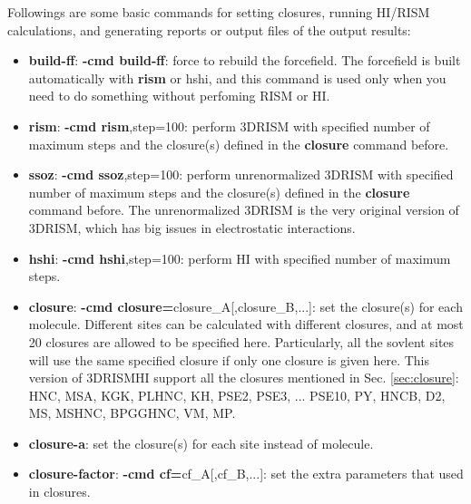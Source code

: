 \documentclass[aip,amsmath,amssymb,reprint,onecolumn]{revtex4-1}
\begin{document}
Followings are some basic commands for setting closures, running HI/RISM calculations, and generating reports or output files of the output results:

\begin{itemize}
    \item {\bf build-ff}: {\bf -cmd build-ff}: force to rebuild the forcefield. The forcefield is built automatically with {\bf rism} or {\rm hshi}, and this command is used only when you need to do something without perfoming RISM or HI.

    \item {\bf rism}: {\bf -cmd rism},step=100: perform 3DRISM with specified number of maximum steps and the closure(s) defined in the {\bf closure} command before.
    \item {\bf ssoz}: {\bf -cmd ssoz},step=100: perform unrenormalized 3DRISM with specified number of maximum steps and the closure(s) defined in the {\bf closure} command before. The unrenormalized 3DRISM is the very original version of 3DRISM, which has big issues in electrostatic interactions.
    \item {\bf hshi}: {\bf -cmd hshi},step=100: perform HI with specified number of maximum steps.

    \item {\bf closure}: {\bf -cmd closure=}closure\_A[,closure\_B,...]: set the closure(s) for each molecule. Different sites can be calculated with different closures, and at most 20 closures are allowed to be specified here. Particularly, all the sovlent sites will use the same specified closure if only one closure is given here. This version of 3DRISMHI support all the closures mentioned in Sec. \ref{sec:closure}: HNC, MSA, KGK, PLHNC, KH, PSE2, PSE3, ... PSE10, PY, HNCB, D2, MS, MSHNC, BPGGHNC, VM, MP.
    \item {\bf closure-a}: set the closure(s) for each site instead of molecule.
    \item {\bf closure-factor}: {\bf -cmd cf=}cf\_A[,cf\_B,...]: set the extra parameters that used in closures.


\end{itemize}
\end{document}
